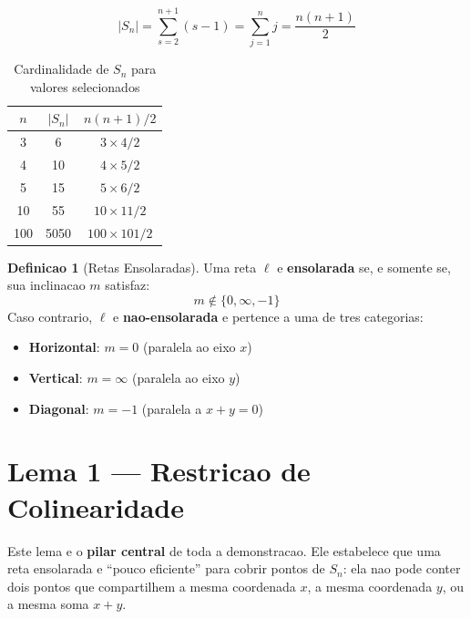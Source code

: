\documentclass[5p]{elsarticle}
\theoremstyle{definition}
\newtheorem{definition}[lemma]{Definicao}
\begin{document}
\begin{equation}\label{eq:N}
  |S_n| = \sum_{s=2}^{n+1} (s-1) = \sum_{j=1}^{n} j = \frac{n(n+1)}{2}
\end{equation}

\begin{table}[H]
  \centering
  \caption{Cardinalidade de $S_n$ para valores selecionados}
  \begin{tabular}{c|c|c}
    \toprule
    $n$ & $|S_n|$ & $n(n+1)/2$ \\
    \midrule
    3 & 6 & $3 \times 4 / 2$ \\
    4 & 10 & $4 \times 5 / 2$ \\
    5 & 15 & $5 \times 6 / 2$ \\
    10 & 55 & $10 \times 11 / 2$ \\
    100 & 5050 & $100 \times 101 / 2$ \\
    \bottomrule
  \end{tabular}
\end{table}

\begin{definition}[Retas Ensolaradas]\label{def:sunny}
  Uma reta $\ell$ e \textbf{ensolarada} se, e somente se, sua inclinacao $m$ satisfaz:
  \begin{equation}\label{eq:sunny-cond}
    m \notin \{0, \infty, -1\}
  \end{equation}
  Caso contrario, $\ell$ e \textbf{nao-ensolarada} e pertence a uma de tres categorias:
  \begin{itemize}
    \item \textbf{Horizontal}: $m = 0$ (paralela ao eixo $x$)
    \item \textbf{Vertical}: $m = \infty$ (paralela ao eixo $y$)
    \item \textbf{Diagonal}: $m = -1$ (paralela a $x+y=0$)
  \end{itemize}
\end{definition}

\section{Lema 1 — Restricao de Colinearidade}

Este lema e o \textbf{pilar central} de toda a demonstracao. Ele estabelece que uma
reta ensolarada e ``pouco eficiente'' para cobrir pontos de $S_n$: ela nao pode conter
dois pontos que compartilhem a mesma coordenada $x$, a mesma coordenada $y$, ou a mesma
soma $x+y$.
\end{document}
